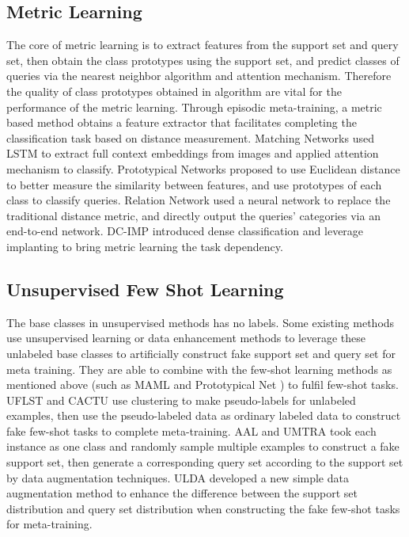 \documentclass[conference]{IEEEtran}
\begin{document}
\subsection{Metric Learning}
The core of metric learning is to extract features from the support set and query set, then obtain the class prototypes using the support set, and predict classes of queries via the nearest neighbor algorithm and attention mechanism. Therefore the quality of class prototypes obtained in algorithm are vital for the performance of the metric learning. Through episodic meta-training, a metric based method obtains a feature extractor that facilitates completing the classification task based on distance measurement. Matching Networks \cite{vinyals2016matching} used LSTM to extract full context embeddings from images and applied attention mechanism to classify. Prototypical Networks \cite{snell2017prototypical} proposed to use Euclidean distance to better measure the similarity between features, and use prototypes of each class to classify queries. Relation Network \cite{sung2018learning} used a neural network to replace the traditional distance metric, and directly output the queries’ categories via an end-to-end network. DC-IMP \cite{lifchitz2019dense} introduced dense classification and leverage implanting to bring metric learning the task dependency.


\subsection{Unsupervised Few Shot Learning}
The base classes in unsupervised methods has no labels. Some existing methods use unsupervised learning or data enhancement methods to leverage these unlabeled base classes to artificially construct fake support set and query set for meta training. They are able to combine with the few-shot learning methods as mentioned above (such as MAML \cite{finn2017model} and Prototypical Net \cite{snell2017prototypical}) to fulfil few-shot tasks. UFLST \cite{ji2019unsupervised} and CACTU \cite{hsu2018unsupervised} use clustering to make pseudo-labels for unlabeled examples, then use the pseudo-labeled data as ordinary labeled data to construct fake few-shot tasks to complete meta-training.  AAL \cite{antoniou2019assume} and UMTRA \cite{khodadadeh2019unsupervised} took each instance as one class and randomly sample multiple examples to construct a fake support set, then generate a corresponding query set according to the support set by data augmentation techniques. ULDA \cite{qin2020unsupervised} developed a new simple data augmentation method to enhance the difference between the support set distribution and query set distribution when constructing the fake few-shot tasks for meta-training.
\end{document}
